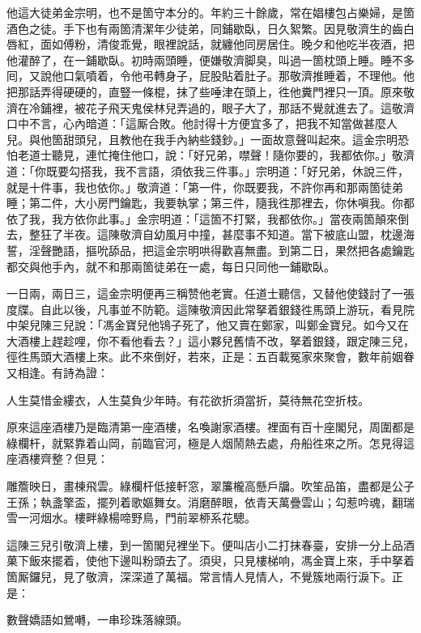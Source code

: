 他這大徒弟金宗明，也不是箇守本分的。年約三十餘歲，常在娼樓包占樂婦，是箇酒色之徒。手下也有兩箇清潔年少徒弟，同鋪歇臥，日久絮繁。{}因見敬濟生的齒白唇紅，面如傅粉，清俊乖覺，眼裡說話，就纏他同房居住。晚夕和他吃半夜酒，把他灌醉了，在一鋪歇臥。初時兩頭睡，便嫌敬濟脚臭，叫過一箇枕頭上睡。睡不多囘，又說他口氣噴着，令他弔轉身子，屁股貼着肚子。那敬濟推睡着，不理他。他把那話弄得硬硬的，直豎一條棍，抹了些唾津在頭上，徃他糞門裡只一頂。原來敬濟在冷鋪裡，被花子飛天鬼侯林兒弄過的，眼子大了，那話不覺就進去了。{}這敬濟口中不言，心內暗道：「這厮合敗。他討得十方便宜多了，把我不知當做甚麼人兒。與他箇甜頭兒，且教他在我手內納些錢鈔。」一面故意聲叫起來。這金宗明恐怕老道士聽見，連忙掩住他口，說：「好兄弟，噤聲！隨你要的，我都依你。」敬濟道：「你既要勾搭我，我不言語，須依我三件事。」{}宗明道：「好兄弟，休說三件，就是十件事，我也依你。」敬濟道：「第一件，你既要我，不許你再和那兩箇徒弟睡；第二件，大小房門鑰匙，我要執掌；第三件，隨我徃那裡去，你休嗔我。你都依了我，我方依你此事。」金宗明道：「這箇不打緊，我都依你。」當夜兩箇顛來倒去，整狂了半夜。這陳敬濟自幼風月中撞，甚麼事不知道。當下被底山盟，枕邊海誓，淫聲艷語，摳吮舔品，{}把這金宗明哄得歡喜無盡。到第二日，果然把各處鑰匙都交與他手內，就不和那兩箇徒弟在一處，每日只同他一鋪歇臥。

一日兩，兩日三，這金宗明便再三稱赞他老實。任道士聽信，又替他使錢討了一張度牒。自此以後，凡事並不防範。這陳敬濟因此常拏着銀錢徃馬頭上游玩，看見院中架兒陳三兒說：「馮金寶兒他鴇子死了，他又賣在鄭家，叫鄭金寶兒。如今又在大酒樓上趕趁哩，你不看他看去？」這小夥兒舊情不改，拏着銀錢，跟定陳三兒，徑徃馬頭大酒樓上來。此不來倒好，若來，正是：五百載冤家來聚會，數年前姻眷又相逢。有詩為證：

人生莫惜金縷衣，人生莫負少年時。有花欲折須當折，莫待無花空折枝。

原來這座酒樓乃是臨清第一座酒樓，名喚謝家酒樓。裡面有百十座閣兒，周圍都是綠欄杆，就緊靠着山岡，前臨官河，極是人烟鬧熱去處，舟船徃來之所。怎見得這座酒樓齊整？但見：

雕簷映日，畫棟飛雲。綠欄杆低接軒窓，翠簾櫳高懸戶牖。吹笙品笛，盡都是公子王孫；執盞擎盃，擺列着歌嫗舞女。消磨醉眼，依青天萬疊雲山；勾惹吟魂，翻瑞雪一河烟水。樓畔綠楊啼野鳥，門前翠桺系花驄。

這陳三兒引敬濟上樓，到一箇閣兒裡坐下。便叫店小二打抹春臺，安排一分上品酒菓下飯來擺着，使他下邊叫粉頭去了。須臾，只見樓梯响，馮金寶上來，手中拏着箇厮鑼兒，見了敬濟，深深道了萬福。常言情人見情人，不覺簇地兩行淚下。{}正是：

數聲嬌語如鶯囀，一串珍珠落線頭。

